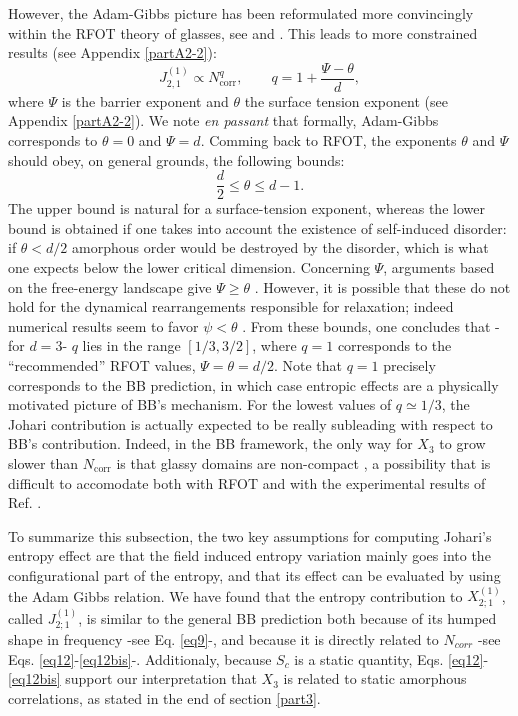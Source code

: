 \documentclass[single column,pre]{revtex4}
\begin{document}
However, the Adam-Gibbs picture has been reformulated more convincingly within the RFOT theory of glasses, see \cite{RFOT} and \cite{Bou04}. This leads to more constrained results (see Appendix \ref{partA2-2}):
\begin{equation}
J_{2,1}^{(1)} \propto N_{\text{corr}}^q, \qquad q = 1 + \frac{\Psi - \theta}{d}, 
\label{eq12bis}
\end{equation}
where $\Psi$ is the barrier exponent and $\theta$ the surface tension exponent (see Appendix \ref{partA2-2}). We note \textit{en passant} that formally, Adam-Gibbs corresponds to $\theta=0$ and $\Psi=d$. Comming back to RFOT, the exponents $\theta$ and $\Psi$ should obey, on general grounds, the following bounds:
\begin{equation}
\frac{d}{2} \leq \theta \leq d-1.
\end{equation}
The upper bound is natural for a surface-tension exponent, whereas the lower bound is obtained if one takes into account
the existence of self-induced disorder: if $\theta < d/2$ amorphous order would be destroyed by the disorder, which is what one expects below the lower critical dimension. 
Concerning $\Psi$, arguments based on the free-energy landscape give $\Psi\ge \theta$ \cite{Bou04}. 
However, it is possible that these do not hold for the dynamical rearrangements responsible for relaxation; indeed numerical results seem to favor $\psi< \theta$ \cite{cavagnapsi}.
 From these bounds, one concludes \cite{values} that -for $d=3$- $q$ lies in the range $[1/3,3/2]$, 
where $q=1$ corresponds to the ``recommended'' RFOT values, $\Psi=\theta=d/2$. Note that $q=1$ precisely corresponds to the BB prediction, in which case entropic effects are a physically motivated picture of BB's mechanism. For the lowest values of $q \simeq 1/3$, the 
Johari contribution is actually expected to be really subleading with respect to BB's contribution. Indeed, in the BB framework, the only way for $X_3$ to grow slower than $N_{\text{corr}}$ is that glassy domains are non-compact \cite{Alb16}, a possibility that is difficult to accomodate both with RFOT and with the experimental results of Ref. \cite{Alb16}.

To summarize this subsection, the two key assumptions for computing Johari's entropy effect are that the field induced entropy variation mainly goes into the configurational part of the entropy, and that its effect can be evaluated by using the Adam Gibbs relation. We have found that the entropy contribution to $X_{2;1}^{(1)}$, called $J_{2;1}^{(1)}$, is similar to the general BB prediction both because of its humped shape in frequency -see Eq. \ref{eq9}-, and because it is directly related to $N_{corr}$ -see Eqs. \ref{eq12}-\ref{eq12bis}-. Additionaly, because $S_c$ is a static quantity, Eqs. \ref{eq12}-\ref{eq12bis} support our interpretation that $X_3$ is related to static amorphous correlations, as stated in the end of section \ref{part3}.
\end{document}
